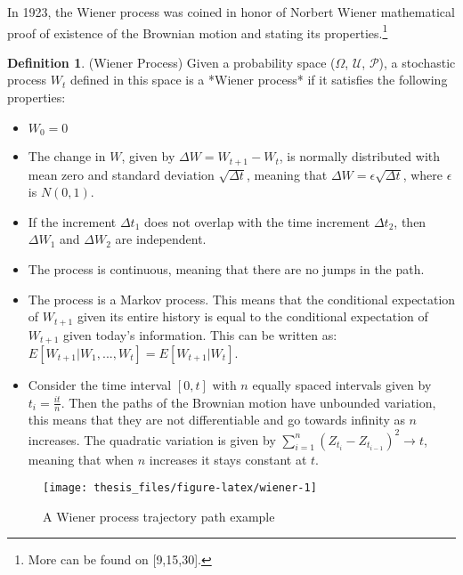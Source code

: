 \documentclass[12pt,twoside]{reedthesis}
\theoremstyle{definition}
\newtheorem{definition}{Definition}[section]
\theoremstyle{definition}
\theoremstyle{remark}
\begin{document}
  In 1923, the Wiener process was coined in honor of Norbert Wiener
  mathematical proof of existence of the Brownian motion and stating its
  properties.\footnote{More can be found on {[}9,15,30{]}.}
  \begin{definition}{(Wiener Process)} Given a probability space ($\Omega$, $\mathcal {U}$, $\mathcal {P}$), a stochastic process $W_t$ defined in this space is a *Wiener process* if it satisfies the following properties:
  \begin{itemize}
    \item  $W_{0}=0$
    
    \item The change in $W$, given by $\Delta W = W_{t+1}-W_{t}$, is normally distributed with mean zero and standard deviation $\sqrt{\Delta t}$, meaning that $\Delta W = \epsilon\sqrt{\Delta t}$, where $\epsilon$ is $N(0,1)$.
    
    \item If the increment $\Delta t_1$ does not overlap with the time increment $\Delta t_2$, then $\Delta W_1$ and $\Delta W_2$ are independent.
    
    \item The process is continuous, meaning that there are no jumps in the path.
    
    \item The process is a Markov process. This means that the conditional expectation of $W_{t+1}$ given its entire history is equal to the conditional expectation of $W_{t+1}$ given today's information. This can be written as: $E[W_{t+1}|W_1, ..., W_t] = E[W_{t+1}|W_t]$.
    
    \item Consider the time interval $[0,t]$ with $n$ equally spaced intervals given by $t_i = \frac{it}{n}$. Then the paths of the Brownian motion have unbounded variation, this means that they are not differentiable and go towards infinity as $n$ increases. The quadratic variation is given by $\sum_{i=1}^{n}{(Z_{t_i}-Z_{t_{i-1}})^2} \rightarrow t$, meaning that when $n$ increases it stays constant at $t$. 
  
  \end{itemize}
  \end{definition}
  \begin{figure}
  
  {\centering \texttt{[image: thesis\_files/figure-latex/wiener-1]} 
  
  }
  
  \caption{A Wiener process trajectory path example \label{wiener}}\label{fig:wiener}
  \end{figure}
\end{document}
